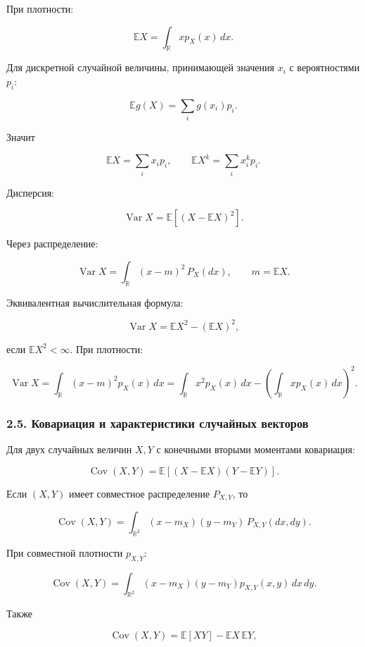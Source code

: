 \documentclass[
  11pt,
  a4paper,
]{article}
\begin{document}
При плотности:

\[
\mathbb EX=\int_{\mathbb R} x p_X(x)\,dx.
\]

Для дискретной случайной величины, принимающей значения \(x_i\) с
вероятностями \(p_i\):

\[
\mathbb E g(X)=\sum_i g(x_i)p_i.
\]

Значит

\[
\mathbb EX=\sum_i x_i p_i,
\qquad
\mathbb EX^k=\sum_i x_i^k p_i.
\]

Дисперсия:

\[
\operatorname{Var}X
=
\mathbb E[(X-\mathbb EX)^2].
\]

Через распределение:

\[
\operatorname{Var}X
=
\int_{\mathbb R} (x-m)^2\,P_X(dx),
\qquad
m=\mathbb EX.
\]

Эквивалентная вычислительная формула:

\[
\operatorname{Var}X=\mathbb EX^2-(\mathbb EX)^2,
\]

если \(\mathbb EX^2<\infty\). При плотности:

\[
\operatorname{Var}X
=
\int_{\mathbb R} (x-m)^2p_X(x)\,dx
=
\int_{\mathbb R} x^2p_X(x)\,dx
-
\left(\int_{\mathbb R} xp_X(x)\,dx\right)^2.
\]

\subsubsection{2.5. Ковариация и характеристики случайных
векторов}\label{ux43aux43eux432ux430ux440ux438ux430ux446ux438ux44f-ux438-ux445ux430ux440ux430ux43aux442ux435ux440ux438ux441ux442ux438ux43aux438-ux441ux43bux443ux447ux430ux439ux43dux44bux445-ux432ux435ux43aux442ux43eux440ux43eux432}

Для двух случайных величин \(X,Y\) с конечными вторыми моментами
ковариация:

\[
\operatorname{Cov}(X,Y)
=
\mathbb E[(X-\mathbb EX)(Y-\mathbb EY)].
\]

Если \((X,Y)\) имеет совместное распределение \(P_{X,Y}\), то

\[
\operatorname{Cov}(X,Y)
=
\int_{\mathbb R^2}(x-m_X)(y-m_Y)\,P_{X,Y}(dx,dy).
\]

При совместной плотности \(p_{X,Y}\):

\[
\operatorname{Cov}(X,Y)
=
\int_{\mathbb R^2}(x-m_X)(y-m_Y)p_{X,Y}(x,y)\,dx\,dy.
\]

Также

\[
\operatorname{Cov}(X,Y)=\mathbb E[XY]-\mathbb EX\,\mathbb EY,
\]
\end{document}
